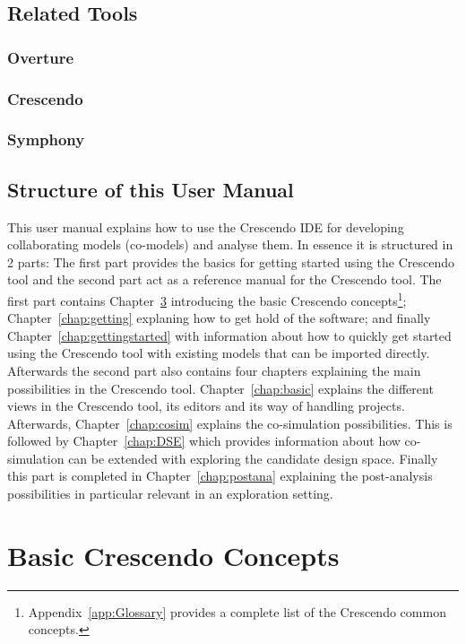 \documentclass{crescendorepchap}
\begin{document}
\section{Related Tools}\label{sec:toolsIntro}

\subsection{Overture}

\subsection{Crescendo}

\subsection{Symphony}

\section{Structure of this User Manual}\label{sec:structure}

This user manual explains how to use the Crescendo IDE for developing collaborating models
 (co-models) and analyse them. In essence it is structured in 2 parts: The first part provides the basics for getting started using the Crescendo tool and the second part act as a reference manual for the Crescendo tool. The first part contains Chapter~\ref{chap:introconcepts} introducing the basic Crescendo concepts\footnote{Appendix~\ref{app:Glossary} provides a complete list of the Crescendo common concepts.};
Chapter~\ref{chap:getting} explaning how to get hold of the software; and finally
Chapter~\ref{chap:gettingstarted} with information about how to quickly get started using the Crescendo tool with existing models that can be imported directly. Afterwards the second part also contains four chapters explaining the main possibilities in the Crescendo tool. Chapter~\ref{chap:basic} explains the different views in the Crescendo tool, its editors and its way of handling projects. Afterwards, Chapter~\ref{chap:cosim} explains the co-simulation possibilities. This is followed by Chapter~\ref{chap:DSE} which provides information about how co-simulation can be extended with exploring the candidate design space. Finally this part is completed in Chapter~\ref{chap:postana} explaining the post-analysis possibilities in particular relevant in an exploration setting.

\chapter{Basic Crescendo Concepts}\label{chap:introconcepts}
\end{document}
